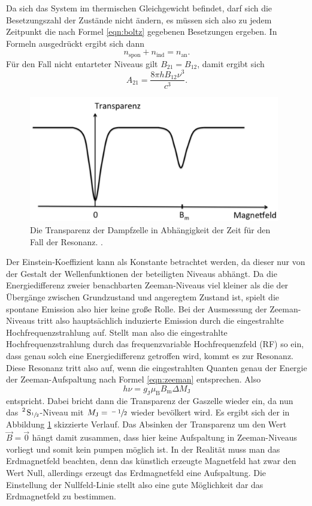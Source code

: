 Da sich das System im thermischen Gleichgewicht befindet, darf sich die Besetzungszahl der Zustände nicht ändern,
es müssen sich also zu jedem Zeitpunkt die nach Formel \eqref{eqn:boltz} gegebenen Besetzungen ergeben. In Formeln ausgedrückt
ergibt sich dann
\begin{equation*}
  n_\text{spon} + n_\text{ind} = n_\text{an}.
\end{equation*}
Für den Fall nicht entarteter Niveaus gilt $B_{21} = B_{12}$, damit ergibt sich
\begin{equation}
  \label{eqn:a}
  A_{21} = \frac{8 \pi h B_{12} \nu^3}{c^3}.
\end{equation}
\begin{figure}
  \centering
  \includegraphics[height=5.5cm]{content/pictures/Resonanz.png}
  \caption{Die Transparenz der Dampfzelle in Abhängigkeit der Zeit für den Fall der Resonanz. \cite{anleitung}.}
  \label{fig:resonanz}
\end{figure}
Der Einstein-Koeffizient kann als Konstante betrachtet werden, da dieser nur von der Gestalt der 
Wellenfunktionen der beteiligten Niveaus abhängt. Da die Energiedifferenz zweier benachbarten Zeeman-Niveaus viel kleiner als
die der Übergänge zwischen Grundzustand und angeregtem Zustand ist, spielt die
spontane Emission also hier keine große Rolle. Bei der Ausmessung der Zeeman-Niveaus tritt also hauptsächlich
induzierte Emission durch die eingestrahlte Hochfrequenzstrahlung auf.
Stellt man also die eingestrahlte Hochfrequenzstrahlung durch das frequenzvariable Hochfrequenzfeld (RF) so ein,
dass genau solch eine Energiedifferenz getroffen wird, kommt es zur Resonanz.
Diese Resonanz tritt also auf, wenn die eingestrahlten Quanten genau der Energie der Zeeman-Aufspaltung nach Formel \eqref{eqn:zeeman} entsprechen.
Also 
\begin{equation}
\label{eqn:B}
  h \nu = g_\text{J} \mu_\text{B} B_\text{m} \Delta M_\text{J}
\end{equation}
entspricht. Dabei bricht dann die Transparenz der Gaszelle wieder ein, da nun das $\ce{^2 S_{\sfrac{1}{2}}}$-Niveau mit $M_\text{J}=\sfrac{-1}{2}$ wieder 
bevölkert wird. Es ergibt sich der in Abbildung \ref{fig:resonanz} skizzierte Verlauf.
Das Absinken der Transparenz um den Wert $\vec{B}=\vec{0}$ hängt damit zusammen, dass hier keine Aufspaltung in Zeeman-Niveaus vorliegt
und somit kein pumpen möglich ist. In der Realität muss man das Erdmagnetfeld beachten, denn das 
künstlich erzeugte Magnetfeld hat zwar den Wert Null, allerdings erzeugt das Erdmagnetfeld eine Aufspaltung. Die Einstellung der Nullfeld-Linie
stellt also eine gute Möglichkeit dar das Erdmagnetfeld zu bestimmen.


